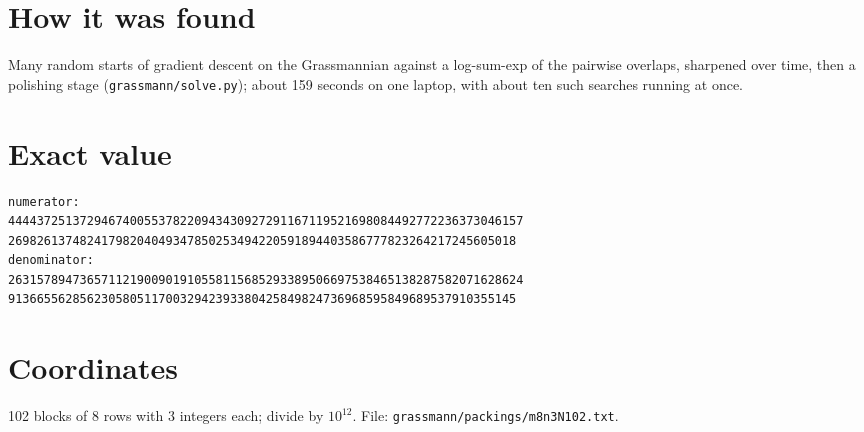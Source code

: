 \documentclass[11pt,a4paper]{article}
\begin{document}
\section{How it was found}
Many random starts of gradient descent on the Grassmannian against a log-sum-exp of the pairwise overlaps, sharpened over time, then a polishing stage (\texttt{grassmann/solve.py}); about 159 seconds on one laptop, with about ten such searches running at once.


\appendix
\section{Exact value}
{\small
\begin{verbatim}
numerator:
444437251372946740055378220943430927291167119521698084492772236373046157
26982613748241798204049347850253494220591894403586777823264217245605018
denominator:
263157894736571121900901910558115685293389506697538465138287582071628624
91366556285623058051170032942393380425849824736968595849689537910355145
\end{verbatim}}

\section{Coordinates}
102 blocks of 8 rows with 3 integers each; divide by $10^{12}$. File: \texttt{grassmann/packings/m8n3N102.txt}.
{\tiny
\begin{multicols}{3}
\end{multicols}}
\end{document}
